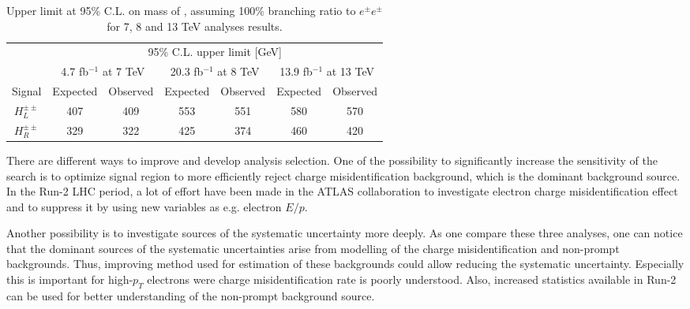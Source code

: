 \begin{table*}[]
\begin{center}
\begin{tabular}{c||c|c||c|c||c|c}

 & \multicolumn{6}{c}{95\%  C.L. upper limit [GeV]} \\
 & \multicolumn{2}{c||}{4.7 fb$^{-1}$ at 7 TeV} & \multicolumn{2}{c||}{20.3 fb$^{-1}$ at 8 TeV} & \multicolumn{2}{c}{13.9 fb$^{-1}$ at 13 TeV} \\
 \hline
Signal & Expected & Observed & Expected & Observed & Expected & Observed \\
\hline
\rule{0pt}{3ex}

$H^{\pm\pm}_L$ & 407 & 409 & 553 & 551 & 580 & 570 \\
\hline
$H^{\pm\pm}_R$ & 329 & 322 & 425 & 374 & 460 & 420 \\
\end{tabular}
\end{center}
 \caption{Upper limit at 95\% C.L. on mass of \dch, assuming 100\% branching ratio to $e^{\pm}e^{\pm}$ for 7, 8 and 13 TeV analyses results.}
\label{tab:DCH_limit_vs_years}
\end{table*}

There are different ways to improve and develop analysis selection.
One of the possibility to significantly increase the sensitivity of the search is to optimize signal region to more efficiently reject charge misidentification background, which is the dominant background source. In the Run-2 LHC period, a lot of effort have been made in the ATLAS collaboration to investigate electron charge misidentification effect and to suppress it by using new variables as e.g. electron $E/p$.

Another possibility is to investigate sources of the systematic uncertainty more deeply.
As one compare these three analyses, one can notice that the dominant sources of the systematic uncertainties arise from modelling of the charge misidentification and non-prompt backgrounds. Thus, improving method used for estimation of these backgrounds could allow reducing the systematic uncertainty. Especially this is important for high-$p_T$ electrons were charge misidentification rate is poorly understood.
Also, increased statistics available in Run-2 can be used for better understanding of the non-prompt background source.

